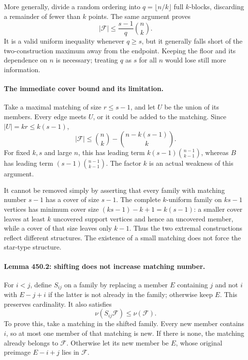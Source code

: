 \documentclass[11pt]{article}
\begin{document}
More generally, divide a random ordering into $q=\lfloor n/k\rfloor$ full $k$-blocks, discarding a remainder of fewer than $k$ points. The same argument proves
\begin{equation}\label{a450:partition}
                 |\mathcal F|\leq\frac{s-1}{q}\binom nk.
\end{equation}
It is a valid uniform inequality whenever $q\geq s$, but it generally falls short of the two-construction maximum away from the endpoint. Keeping the floor and its dependence on $n$ is necessary; treating $q$ as $s$ for all $n$ would lose still more information.

\paragraph{The immediate cover bound and its limitation.}
Take a maximal matching of size $r\leq s-1$, and let $U$ be the union of its members. Every edge meets $U$, or it could be added to the matching. Since $|U|=kr\leq k(s-1)$,
\begin{equation}\label{a450:cover}
          |\mathcal F|\leq\binom nk-\binom{n-k(s-1)}k.
\end{equation}
For fixed $k,s$ and large $n$, this has leading term $k(s-1)\binom{n-1}{k-1}$, whereas $B$ has leading term $(s-1)\binom{n-1}{k-1}$. The factor $k$ is an actual weakness of this argument.

It cannot be removed simply by asserting that every family with matching number $s-1$ has a cover of size $s-1$. The complete $k$-uniform family on $ks-1$ vertices has minimum cover size $(ks-1)-k+1=k(s-1)$: a smaller cover leaves at least $k$ uncovered support vertices and hence an uncovered member, while a cover of that size leaves only $k-1$. Thus the two extremal constructions reflect different structures. The existence of a small matching does not force the star-type structure.

\paragraph{Lemma 450.2: shifting does not increase matching number.}
For $i<j$, define $S_{ij}$ on a family by replacing a member $E$ containing $j$ and not $i$ with $E-j+i$ if the latter is not already in the family; otherwise keep $E$. This preserves cardinality. It also satisfies
\begin{equation}\label{a450:shift}
                         \nu(S_{ij}\mathcal F)\leq\nu(\mathcal F).
\end{equation}
To prove this, take a matching in the shifted family. Every new member contains $i$, so at most one member of that matching is new. If there is none, the matching already belongs to $\mathcal F$. Otherwise let its new member be $E$, whose original preimage $E-i+j$ lies in $\mathcal F$.
\end{document}
